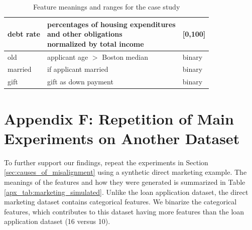\documentclass[mnsc,blindrev]{informs3}
\begin{document}
\begin{table}[ht!]
\begin{tabular}{l|l|l}
            debt rate           & \makecell[l]{percentages of housing expenditures \\ and other obligations \\ normalized by total income}    & {[}0,100{]}                   \\ \hline
            old              & applicant age $>$ Boston median & binary                        \\ \hline
            married          & if applicant married               & binary                        \\ \hline
            gift             & gift as down payment               & binary                         \\
            \bottomrule
            \end{tabular}
            \caption{Feature meanings and ranges for the case study}
            \label{apx_tab:case_study_features}
        \end{table}


  

    
    
    \section*{Appendix F: Repetition of Main Experiments on Another Dataset}
        \label{apx_sec:marketing}
        To further support our findings, repeat the experiments in Section \ref{sec:causes_of_misalignment} using a synthetic direct marketing example. The meanings of the features and how they were generated is summarized in Table \ref{apx_tab:marketing_simulated}. Unlike the loan application dataset, the direct marketing dataset contains categorical features. We binarize the categorical features, which contributes to this dataset having more features than the loan application dataset (16 versus 10). 
\end{document}
